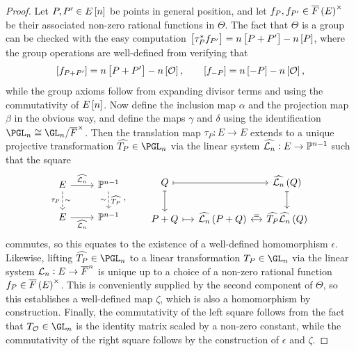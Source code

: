 \begin{proof}
Let $ P, P' \in E\sbr{n} $ be points in general position, and let $ f_P, f_{P'} \in \overline{F}\br{E}^\times $ be their associated non-zero rational functions in $ \Theta $. The fact that $ \Theta $ is a group can be checked with the easy computation $ \sbr{\tau_P^*f_{P'}} = n\sbr{P + P'} - n\sbr{P} $, where the group operations are well-defined from verifying that
$$ \sbr{f_{P + P'}} = n\sbr{P + P'} - n\sbr{\OOO}, \qquad \sbr{f_{-P}} = n\sbr{-P} - n\sbr{\OOO}, $$
while the group axioms follow from expanding divisor terms and using the commutativity of $ E\sbr{n} $. Now define the inclusion map $ \alpha $ and the projection map $ \beta $ in the obvious way, and define the maps $ \gamma $ and $ \delta $ using the identification $ \PGL_n \cong \GL_n / \overline{F}^\times $. Then the translation map $ \tau_P : E \to E $ extends to a unique projective transformation $ \widehat{T_P} \in \PGL_n $ via the linear system $ \widehat{\mathcal{L}_n} : E \to \mathbb{P}^{n - 1} $ such that the square
$$
\begin{tikzcd}
E \arrow{r}{\widehat{\LLL_n}} \arrow[dashed]{d}{\sim}[swap]{\tau_P} & \PP^{n - 1} \arrow[dashed]{d}{\widehat{T_P}}[swap]{\sim} \\
E \arrow{r}[swap]{\widehat{\LLL_n}} & \PP^{n - 1}
\end{tikzcd},
\qquad
\begin{tikzcd}[column sep=small]
Q \arrow[mapsto]{rr} \arrow[mapsto]{d} & & \widehat{\LLL_n}\br{Q} \arrow[mapsto]{d} \\
P + Q \arrow[mapsto]{r} & \widehat{\LLL_n}\br{P + Q} \arrow[leftrightarrow]{r}{=} & \widehat{T_P}\widehat{\LLL_n}\br{Q}
\end{tikzcd}
$$
commutes, so this equates to the existence of a well-defined homomorphism $ \epsilon $. Likewise, lifting $ \widehat{T_P} \in \PGL_n $ to a linear transformation $ T_P \in \GL_n $ via the linear system $ \mathcal{L}_n : E \to \overline{F}^n $ is unique up to a choice of a non-zero rational function $ f_P \in \overline{F}\br{E}^\times $. This is conveniently supplied by the second component of $ \Theta $, so this establishes a well-defined map $ \zeta $, which is also a homomorphism by construction. Finally, the commutativity of the left square follows from the fact that $ T_\OOO \in \GL_n $ is the identity matrix scaled by a non-zero constant, while the commutativity of the right square follows by the construction of $ \epsilon $ and $ \zeta $.
\end{proof}

\pagebreak

